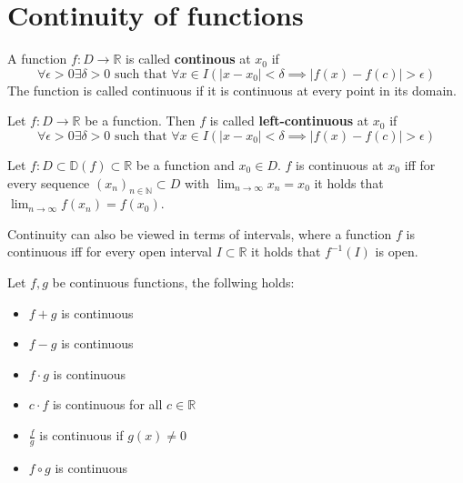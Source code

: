 \section{Continuity of functions}

\begin{definition}
    A function $f: D \to \mathbb{R}$ is called \textbf{continous} at $x_0$ if
    $$\forall \epsilon \gt 0 \exists \delta \gt 0 \text{ such that } \forall x \in I (\mid x - x_0 \mid \lt \delta \implies \mid f(x) - f(c) \mid \gt \epsilon)$$
    The function is called continuous if it is continuous at every point in its domain.
\end{definition}

\begin{definition}
    Let $f: D \to \mathbb{R}$ be a function. Then $f$ is called \textbf{left-continuous} at $x_0$ if
    $$\forall \epsilon \gt 0 \exists \delta \gt 0 \text{ such that } \forall x \in I (\mid x - x_0 \mid \lt \delta \implies \mid f(x) - f(c) \mid \gt \epsilon)$$
\end{definition}

\begin{theorem}
    Let $f: D \subset \mathbb{D}(f) \subset \mathbb{R}$ be a function and $x_0 \in D$. $f$ is continuous at $x_0$ iff for every sequence $(x_n)_{n\in\mathbb{N}} \subset D$ with $\lim_{n\to\infty} x_n = x_0$ it holds that $\lim_{n\to\infty} f(x_n) = f(x_0)$.
\end{theorem}

\begin{remark}
    Continuity can also be viewed in terms of intervals, where a function $f$ is continuous iff for every open interval $I \subset \mathbb{R}$ it holds that $f^{-1}(I)$ is open.
\end{remark}

\begin{lemma}
    Let $f, g$ be continuous functions, the follwing holds:
    \begin{itemize}
        \item $f+g$ is continuous
        \item $f-g$ is continuous
        \item $f \cdot g$ is continuous
        \item $c \cdot f$ is continuous for all $c \in \mathbb{R}$
        \item $\frac{f}{g}$ is continuous if $g(x) \neq 0$
        \item $f \circ g$ is continuous
    \end{itemize}
\end{lemma}

